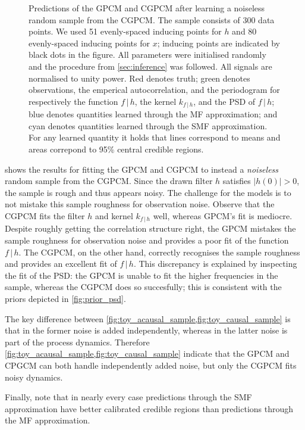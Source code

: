 \documentclass{article}
\newcommand{\cond}{\, | \,}               %
\begin{document}
\begin{figure}[t]
    \caption{Predictions of the GPCM and CGPCM after learning a noiseless random sample from the CGPCM. The sample consists of 300 data points. We used 51 evenly-spaced inducing points for $h$ and 80 evenly-spaced inducing points for $x$; inducing points are indicated by black dots in the figure. All parameters were initialised randomly and the procedure from \cref{sec:inference} was followed. All signals are normalised to unity power. {\color{red}Red} denotes truth; {\color{darkgreen}green} denotes observations, the emperical autocorrelation, and the periodogram for respectively the function $f\cond h$, the kernel $k_{f\cond h}$, and the PSD of $f\cond h$; {\color{blue}blue} denotes quantities learned through the MF approximation; and {\color{mycyan}cyan} denotes quantities learned through the SMF approximation. For any learned quantity it holds that lines correspond to means and areas correpond to 95\% central credible regions.}
    \label{fig:toy_causal_sample}
\end{figure}

 shows the results for fitting the GPCM and CGPCM to instead a \textit{noiseless} random sample from the CGPCM. Since the drawn filter $h$ satisfies $|h(0)|>0$, the sample is rough and thus appears noisy. The challenge for the models is to not mistake this sample roughness for observation noise. Observe that the CGPCM fits the filter $h$ and kernel $k_{f \cond h}$ well, whereas GPCM's fit is mediocre. Despite roughly getting the correlation structure right, the GPCM mistakes the sample roughness for observation noise and provides a poor fit of the function $f\cond h$. The CGPCM, on the other hand, correctly recognises the sample roughness and provides an excellent fit of $f \cond h$. This discrepancy is explained by inspecting the fit of the PSD: the GPCM is unable to fit the higher frequencies in the sample, whereas the CGPCM does so succesfully; this is consistent with the priors depicted in \cref{fig:prior_psd}.

The key difference between \cref{fig:toy_acausal_sample,fig:toy_causal_sample} is that in the former noise is added independently, whereas in the latter noise is part of the process dynamics. Therefore \cref{fig:toy_acausal_sample,fig:toy_causal_sample} indicate that the GPCM and CPGCM can both handle independently added noise, but only the CGPCM fits noisy dynamics.

Finally, note that in nearly every case predictions through the SMF approximation have better calibrated credible regions than predictions through the MF approximation.
\end{document}
